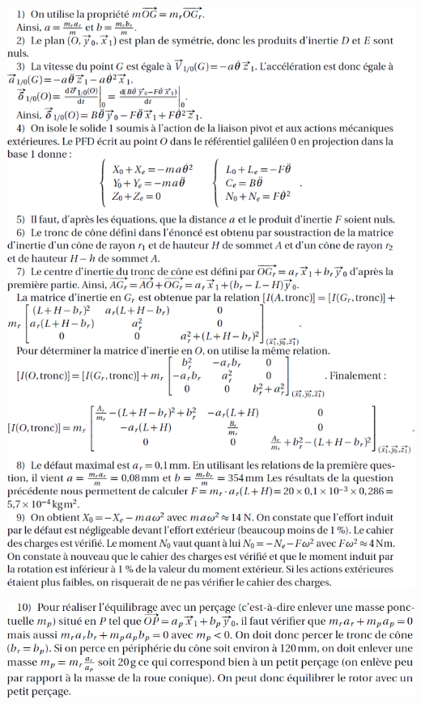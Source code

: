 \documentclass[10pt,fleqn]{article} %
\begin{document}
\begin{center}
\includegraphics[width=\linewidth]{images/cor_01.png}
\end{center}
\begin{center}
\includegraphics[width=\linewidth]{images/cor_02.png}
\end{center}
\end{document}
